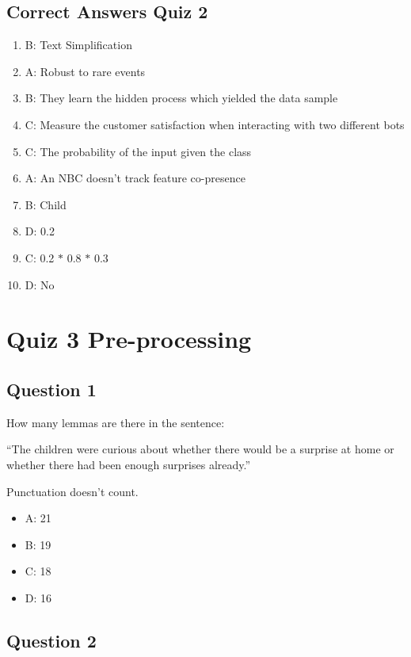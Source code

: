 \documentclass[
  11pt,
  british,
]{article}
\providecommand{\tightlist}{%
  \setlength{\itemsep}{0pt}\setlength{\parskip}{0pt}}
\begin{document}
\hypertarget{correct-answers-quiz-2}{%
\subsection{Correct Answers Quiz 2}\label{correct-answers-quiz-2}}

\begin{enumerate}
\def\labelenumi{\arabic{enumi}.}
\tightlist
\item
  B: Text Simplification
\item
  A: Robust to rare events
\item
  B: They learn the hidden process which yielded the data sample
\item
  C: Measure the customer satisfaction when interacting with two
  different bots
\item
  C: The probability of the input given the class
\item
  A: An NBC doesn't track feature co-presence
\item
  B: Child
\item
  D: 0.2
\item
  C: 0.2 \(*\) 0.8 \(*\) 0.3
\item
  D: No
\end{enumerate}

\hypertarget{quiz-3-pre-processing}{%
\section{Quiz 3 Pre-processing}\label{quiz-3-pre-processing}}

\hypertarget{question-1-2}{%
\subsection{Question 1}\label{question-1-2}}

How many lemmas are there in the sentence:

``The children were curious about whether there would be a surprise at
home or whether there had been enough surprises already.''

Punctuation doesn't count.

\begin{itemize}
\tightlist
\item
  A: 21
\item
  B: 19
\item
  C: 18
\item
  D: 16
\end{itemize}

\hypertarget{question-2-2}{%
\subsection{Question 2}\label{question-2-2}}
\end{document}
